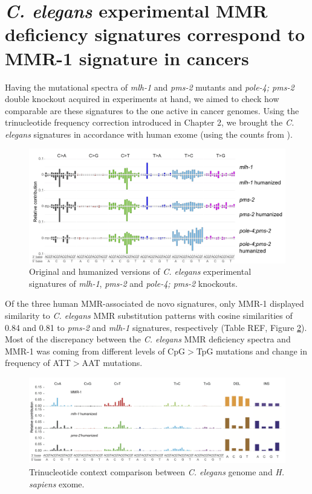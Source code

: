 \section{\textit{C. elegans} experimental MMR deficiency signatures correspond to MMR-1 signature in cancers}

Having the mutational spectra of \textit{mlh-1} and \textit{pms-2} mutants and
\textit{pole-4; pms-2} double knockout acquired in  experiments
at hand, we aimed to check how comparable are these signatures to the one active 
in cancer genomes. Using the trinucleotide frequency correction introduced in Chapter 2,
we brought the \textit{C. elegans} signatures in accordance with human exome (using the counts from \cite{Rosenthal2016-hq}).

\begin{figure}[h]
  \centering
  \centerline{\includegraphics[width=1\textwidth]{figures/mmr_mutational_patterns_for_c_elegans_humanisation.png}}
  \caption{Original and humanized versions of \textit{C. elegans} experimental signatures of \textit{mlh-1}, \textit{pms-2} and \textit{pole-4; pms-2} knockouts.}
  \label{humanized_mmr}
\end{figure}

Of the three human MMR-associated de novo signatures, only MMR-1 displayed 
similarity to \textit{C. elegans} MMR substitution patterns with cosine 
similarities of 0.84 and 0.81 to \textit{pms-2} and \textit{mlh-1} signatures, 
respectively (Table REF, Figure \ref{worm_vs_human}). Most of the discrepancy 
between the \textit{C. elegans} MMR deficiency spectra and MMR-1 was coming 
from different levels of CpG$>$TpG mutations and change in frequency of ATT$>$AAT mutations.

\begin{figure}[h]
  \centering
  \centerline{\includegraphics[width=1\textwidth]{figures/worm-human-mmr-sig.png}}
  \caption{Trinucleotide context comparison between \textit{C. elegans} genome and \textit{H. sapiens} exome.}
  \label{worm_vs_human}
\end{figure}

